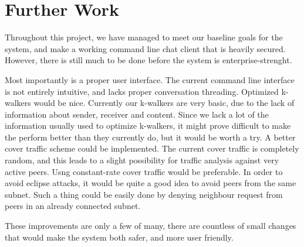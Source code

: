 \section{Further Work}

Throughout this project, we have managed to meet our baseline goals for the system, and make a working command line chat client that is heavily secured. However, there is still much to be done before the system is enterprise-strenght.

Most importantly is a proper user interface. The current command line interface is not entirely intuitive, and lacks proper conversation threading.
Optimized k-walkers would be nice. Currently our k-walkers are very basic, due to the lack of information about sender, receiver and content. Since we lack a lot of the information usually used to optimize k-walkers, it might prove difficult to make the perform better than they currently do, but it would be worth a try.
A better cover traffic scheme could be implemented. The current cover traffic is completely random, and this leads to a slight possibility for traffic analysis against very active peers. Usng constant-rate cover traffic would be preferable.
In order to avoid eclipse attacks, it would be quite a good idea to avoid peers from the same subnet. Such a thing could be easily  done by denying neighbour request from peers in an  already connected subnet.

These improvements are only a few of many, there are countless of small changes that would make the system both safer, and more user friendly.